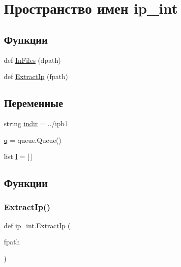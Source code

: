 \hypertarget{namespaceip__int}{}\section{Пространство имен ip\+\_\+int}
\label{namespaceip__int}
\subsection*{Функции}
\begin{DoxyCompactItemize}
\item 
def \hyperlink{namespaceip__int_ac9607d62086cdc4c5631927e26da01d0}{In\+Files} (dpath)
\item 
def \hyperlink{namespaceip__int_a1a05578cb2ec5018f5e481627c649bc7}{Extract\+Ip} (fpath)
\end{DoxyCompactItemize}
\subsection*{Переменные}
\begin{DoxyCompactItemize}
\item 
string \hyperlink{namespaceip__int_a079503e2cdbf08bcbe0c81679a240fa7}{indir} = \textquotesingle{}../ipb1\textquotesingle{}
\item 
\hyperlink{namespaceip__int_a041dcaccf2a18938362434abd47fdc4e}{q} = queue.\+Queue()
\item 
list \hyperlink{namespaceip__int_a90a8e9b5b88d1a0fae518baba83a9f83}{l} = \mbox{[}$\,$\mbox{]}
\end{DoxyCompactItemize}


\subsection{Функции}
\mbox{\label{namespaceip__int_a1a05578cb2ec5018f5e481627c649bc7}} 
\subsubsection{\texorpdfstring{Extract\+Ip()}{ExtractIp()}}
{\footnotesize\ttfamily def ip\+\_\+int.\+Extract\+Ip (\begin{DoxyParamCaption}\item[{}]{fpath }\end{DoxyParamCaption})}



